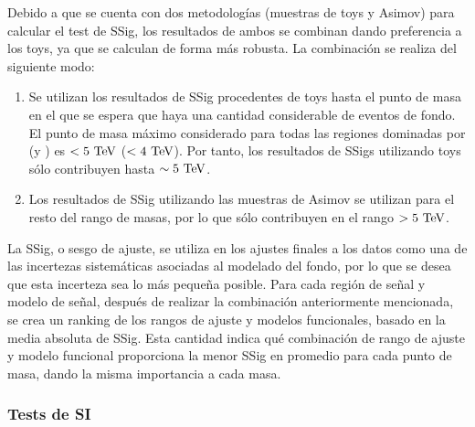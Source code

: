 Debido a que se cuenta con dos metodologías (muestras de toys y Asimov) para calcular el test de \ac{SSig}, los resultados de ambos se combinan dando preferencia a los toys, ya que se calculan de forma más robusta. La combinación se realiza del siguiente modo:
\begin{enumerate}
    \item Se utilizan los resultados de \ac{SSig} procedentes de toys hasta el punto de masa en el que se espera que haya una cantidad considerable de eventos de fondo. El punto de masa máximo considerado para todas las regiones dominadas por \ljets (\bjets y \cjets) es \(<5~\text{TeV}\) (\(<4~\text{TeV}\)). Por tanto, los resultados de \acp{SSig} utilizando toys sólo contribuyen hasta \(\sim 5~\text{TeV}\).
    \item Los resultados de \ac{SSig} utilizando las muestras de Asimov se utilizan para el resto del rango de masas, por lo que sólo contribuyen en el rango \(> 5~\text{TeV}\).
\end{enumerate}
La \ac{SSig}, o sesgo de ajuste, se utiliza en los ajustes finales a los datos como una de las incertezas sistemáticas asociadas al modelado del fondo, por lo que se desea que esta incerteza sea lo más pequeña posible. Para cada región de señal y modelo de señal, después de realizar la combinación anteriormente mencionada, se crea un ranking de los rangos de ajuste y modelos funcionales, basado en la media absoluta de \ac{SSig}. Esta cantidad indica qué combinación de rango de ajuste y modelo funcional proporciona la menor \ac{SSig} en promedio para cada punto de masa, dando la misma importancia a cada masa.

































\subsubsection{Tests de \acl{SI}}
\label{subsubsec:bkg:modeling:sigbkg:sitest}

